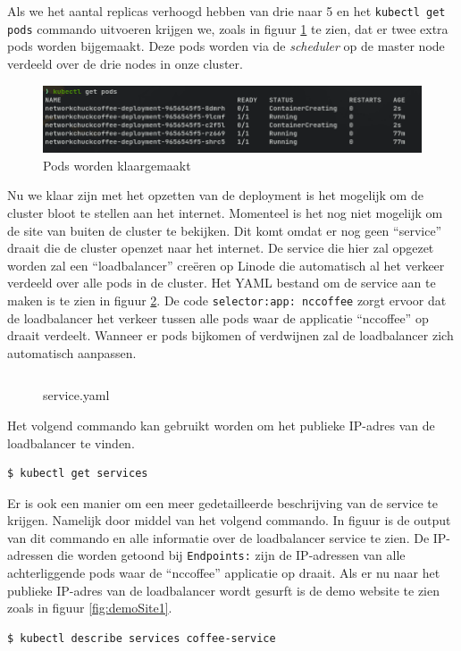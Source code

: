 Als we het aantal replicas verhoogd hebben van drie naar 5 en het \verb|kubectl get pods| commando uitvoeren krijgen we, zoals in figuur \ref{fig:kubectlGetPodsEditDeploy1} te zien, dat er twee extra pods worden bijgemaakt. Deze pods worden via de \textit{scheduler} op de master node verdeeld over de drie nodes in onze cluster.
\begin{figure}[h]
	\centering
	\includegraphics[width=\linewidth]{img/kubectlGetPodsEditDeploy1.png}
	\caption{Pods worden klaargemaakt}
	\label{fig:kubectlGetPodsEditDeploy1}
\end{figure}

Nu we klaar zijn met het opzetten van de deployment is het mogelijk om de cluster bloot te stellen aan het internet. Momenteel is het nog niet mogelijk om de site van buiten de cluster te bekijken. Dit komt omdat er nog geen ``service'' draait die de cluster openzet naar het internet. De service die hier zal opgezet worden zal een ``loadbalancer'' creëren op Linode die automatisch al het verkeer verdeeld over alle pods in de cluster. Het YAML bestand om de service aan te maken is te zien in figuur \ref{service1}. De code \verb|selector:app: nccoffee| zorgt ervoor dat de loadbalancer het verkeer tussen alle pods waar de applicatie ``nccoffee'' op draait verdeelt. Wanneer er pods bijkomen of verdwijnen zal de loadbalancer zich automatisch aanpassen. 

\begin{figure}[h] 
	\inputminted[fontsize=\footnotesize,linenos]{yaml}{files/testservice.yaml}
	\caption{service.yaml}
	\label{service1}
\end{figure}



Het volgend commando kan gebruikt worden om het publieke IP-adres van de loadbalancer te vinden. 
\begin{verbatim} 
$ kubectl get services
\end{verbatim}

Er is ook een manier om een meer gedetailleerde beschrijving van de service te krijgen. Namelijk door middel van het volgend commando. In figuur is de output van dit commando en alle informatie over de loadbalancer service te zien. De IP-adressen die worden getoond bij \verb|Endpoints:| zijn de IP-adressen van alle achterliggende pods waar de ``nccoffee'' applicatie op draait. Als er nu naar het publieke IP-adres van de loadbalancer wordt gesurft is de demo website te zien zoals in figuur \ref{fig:demoSite1}.
\begin{verbatim} 
$ kubectl describe services coffee-service 
\end{verbatim}

